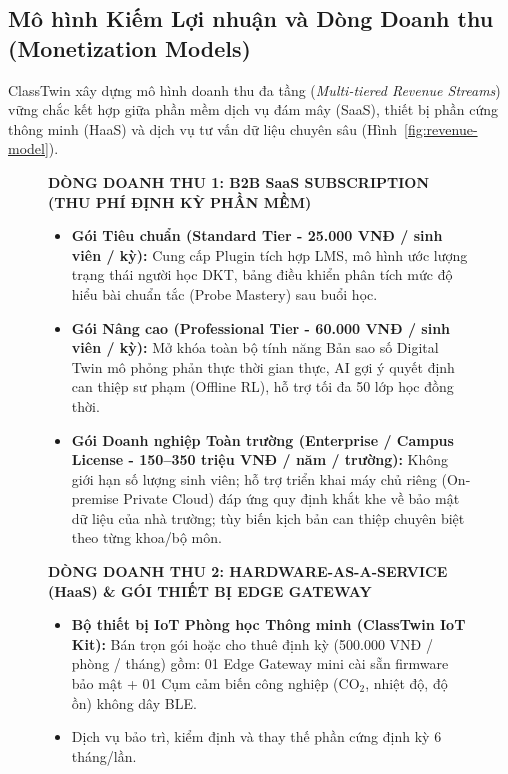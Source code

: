 \subsection{Mô hình Kiếm Lợi nhuận và Dòng Doanh thu (Monetization Models)}\label{subsec:monetization}
ClassTwin xây dựng mô hình doanh thu đa tầng (\textit{Multi-tiered Revenue Streams}) vững chắc kết hợp giữa phần mềm dịch vụ đám mây (SaaS), thiết bị phần cứng thông minh (HaaS) và dịch vụ tư vấn dữ liệu chuyên sâu (Hình~\ref{fig:revenue-model}).

\begin{figure}[htbp]
  \centering
  \begin{tcolorbox}[colback=LightBg, colframe=NavyBlue, boxrule=1pt, arc=4pt, width=0.98\textwidth]
    \small
    \textbf{DÒNG DOANH THU 1: B2B SaaS SUBSCRIPTION (THU PHÍ ĐỊNH KỲ PHẦN MỀM)}
    \begin{itemize}[leftmargin=1.5em]
      \item \textbf{Gói Tiêu chuẩn (Standard Tier - 25.000 VNĐ / sinh viên / kỳ):} Cung cấp Plugin tích hợp LMS, mô hình ước lượng trạng thái người học DKT, bảng điều khiển phân tích mức độ hiểu bài chuẩn tắc (Probe Mastery) sau buổi học.
      \item \textbf{Gói Nâng cao (Professional Tier - 60.000 VNĐ / sinh viên / kỳ):} Mở khóa toàn bộ tính năng Bản sao số Digital Twin mô phỏng phản thực thời gian thực, AI gợi ý quyết định can thiệp sư phạm (Offline RL), hỗ trợ tối đa 50 lớp học đồng thời.
      \item \textbf{Gói Doanh nghiệp Toàn trường (Enterprise / Campus License - 150--350 triệu VNĐ / năm / trường):} Không giới hạn số lượng sinh viên; hỗ trợ triển khai máy chủ riêng (On-premise Private Cloud) đáp ứng quy định khắt khe về bảo mật dữ liệu của nhà trường; tùy biến kịch bản can thiệp chuyên biệt theo từng khoa/bộ môn.
    \end{itemize}
    \vspace{1mm}
    \textbf{DÒNG DOANH THU 2: HARDWARE-AS-A-SERVICE (HaaS) \& GÓI THIẾT BỊ EDGE GATEWAY}
    \begin{itemize}[leftmargin=1.5em]
      \item \textbf{Bộ thiết bị IoT Phòng học Thông minh (ClassTwin IoT Kit):} Bán trọn gói hoặc cho thuê định kỳ (500.000 VNĐ / phòng / tháng) gồm: 01 Edge Gateway mini cài sẵn firmware bảo mật + 01 Cụm cảm biến công nghiệp ($\text{CO}_2$, nhiệt độ, độ ồn) không dây BLE.
      \item Dịch vụ bảo trì, kiểm định và thay thế phần cứng định kỳ 6 tháng/lần.

\end{itemize}
\end{tcolorbox}
\end{figure}
